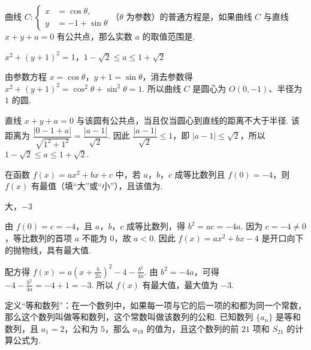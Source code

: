 \begin{problem}
曲线 \(C:\begin{cases}
x&=\cos\theta,\\
y&=-1+\sin\theta
\end{cases}\)（\(\theta\) 为参数）的普通方程是\fillinblank{}，如果曲线 \(C\) 与直线 \(x+y+a=0\) 有公共点，那么实数 \(a\) 的取值范围是\fillinblank{}.
\end{problem}

\begin{answer}
\(x^2+(y+1)^2=1\)，\(1-\sqrt{2}\leqslant a\leqslant1+\sqrt{2}\)
\end{answer}

\begin{solution}
由参数方程 \(x=\cos\theta\)，\(y+1=\sin\theta\)，消去参数得
\(x^2+(y+1)^2=\cos^2\theta+\sin^2\theta=1\).
所以曲线 \(C\) 是圆心为 \(O(0,-1)\)、半径为 \(1\) 的圆.

直线 \(x+y+a=0\) 与该圆有公共点，当且仅当圆心到直线的距离不大于半径. 该距离为
\(\dfrac{|0-1+a|}{\sqrt{1^2+1^2}}=\dfrac{|a-1|}{\sqrt2}\). 因此
\(\dfrac{|a-1|}{\sqrt2}\leqslant1\)，即 \(|a-1|\leqslant\sqrt2\)，所以
\(1-\sqrt2\leqslant a\leqslant1+\sqrt2\).
\end{solution}

\begin{problem}
在函数 \(f(x)=ax^2+bx+c\) 中，若 \(a\)，\(b\)，\(c\) 成等比数列且 \(f(0)=-4\)，则 \(f(x)\) 有最\fillinblank{}值（填“大”或“小”），且该值为\fillinblank{}.
\end{problem}

\begin{answer}
大，\(-3\)
\end{answer}

\begin{solution}
由 \(f(0)=c=-4\)，且 \(a\)，\(b\)，\(c\) 成等比数列，得
\(b^2=ac=-4a\).
因为 \(c=-4\neq0\)，等比数列的首项 \(a\) 不能为 \(0\)，故 \(a<0\). 因此 \(f(x)=ax^2+bx-4\) 是开口向下的抛物线，具有最大值.

配方得 \(f(x)=a\left(x+\frac{b}{2a}\right)^2-4-\frac{b^2}{4a}\). 由 \(b^2=-4a\)，可得 \(-4-\frac{b^2}{4a}=-4+1=-3\).
所以 \(f(x)\) 有最大值，最大值为 \(-3\).
\end{solution}

\begin{problem}
定义“等和数列”：在一个数列中，如果每一项与它的后一项的和都为同一个常数，那么这个数列叫做等和数列，这个常数叫做该数列的公和. 已知数列 \(\{a_n\}\) 是等和数列，且 \(a_1=2\)，公和为 \(5\)，那么 \(a_{18}\) 的值为\fillinblank{}，且这个数列的前 \(21\) 项和 \(S_{21}\) 的计算公式为\fillinblank{}.
\end{problem}

